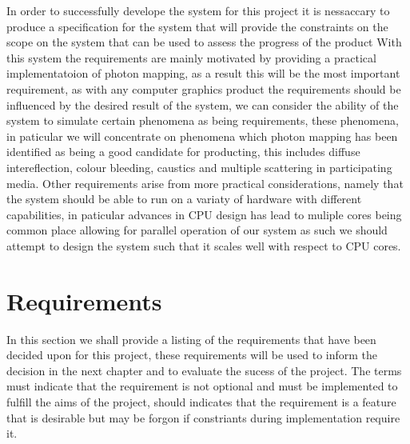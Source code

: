 In order to successfully develope the system for this project it is nessaccary to produce a specification for the system
that will provide the constraints on the scope on the system that can be used to assess the progress of the product
With this system the requirements are mainly motivated by providing a practical implementatoion of photon mapping, as a result
this will be the most important requirement, as with any computer graphics product the requirements should be influenced by the
desired result of the system, we can consider the ability of the system to simulate certain phenomena as being requirements,
these phenomena, in paticular we will concentrate on phenomena which photon mapping has been identified as being a good candidate
for producting, this includes diffuse intereflection, colour bleeding, caustics and multiple scattering in participating media.
Other requirements arise from more practical considerations, namely that the system should be able to run on a variaty of
hardware with different capabilities, in paticular advances in CPU design has lead to muliple cores being common place allowing
for parallel operation of our system as such we should attempt to design the system such that it scales well with respect
to CPU cores.

\section{Requirements}
In this section we shall provide a listing of the requirements that have been decided upon for this project, these
requirements will be used to inform the decision in the next chapter and to evaluate the sucess of the project.
The terms must indicate that the requirement is not optional and must be implemented to fulfill the aims of the project,
should indicates that the requirement is a feature that is desirable but may be forgon if constriants during implementation
require it.


